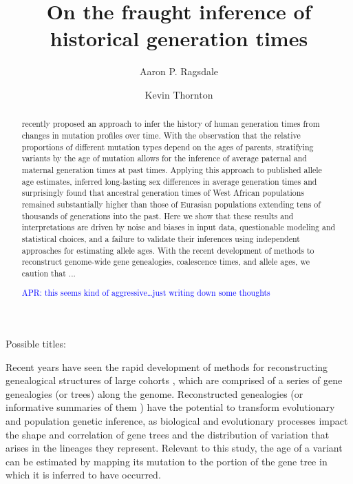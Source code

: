 \documentclass[]{article}
\newcommand{\aprcomment}[1]{{\textcolor{blue}{APR: #1}}}
\begin{document}
\title{On the fraught inference of historical generation times}
\author[1,*]{Aaron P. Ragsdale}
\author[2]{Kevin Thornton}
\maketitle

Possible titles:

\begin{abstract}

    \citet{wang2023human} recently proposed an approach to infer the history of
    human generation times from changes in mutation profiles over time. With
    the observation that the relative proportions of different mutation types
    depend on the ages of parents, stratifying variants by the age of mutation
    allows for the inference of average paternal and maternal generation times
    at past times. Applying this approach to published allele age estimates,
    \citeauthor{wang2023human} inferred long-lasting sex differences in average
    generation times and surprisingly found that ancestral generation times of
    West African populations remained substantially higher than those of
    Eurasian populations extending tens of thousands of generations into the
    past. Here we show that these results and interpretations are driven by
    noise and biases in input data, questionable modeling and statistical
    choices, and a failure to validate their inferences using independent
    approaches for estimating allele ages. With the recent development of
    methods to reconstruct genome-wide gene genealogies, coalescence times, and
    allele ages, we caution that ...

    \aprcomment{this seems kind of aggressive\ldots just writing down some thoughts}

\end{abstract}

Recent years have seen the rapid development of methods for reconstructing
genealogical structures of large cohorts
\citep{speidel2019method,wohns2022unified,hubisz2020mapping}, which are
comprised of a series of gene genealogies (or trees) along the genome.
Reconstructed genealogies (or informative summaries of them
\citep{albers2020dating}) have the potential to transform evolutionary and
population genetic inference, as biological and evolutionary processes impact
the shape and correlation of gene trees and the distribution of variation that
arises in the lineages they represent. Relevant to this study, the age of a
variant can be estimated by mapping its mutation to the portion of the gene
tree in which it is inferred to have occurred.
\end{document}
